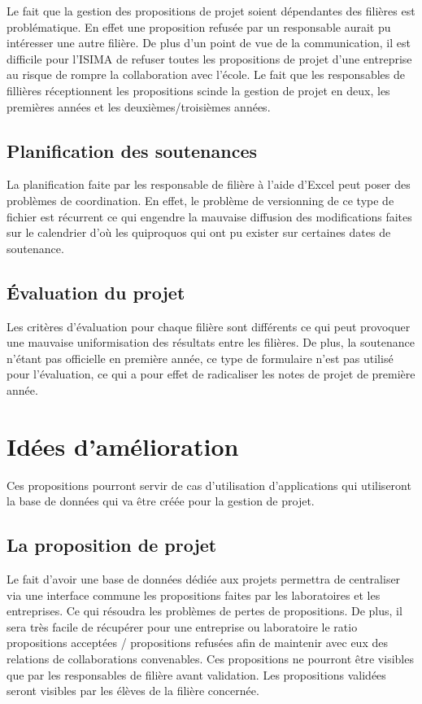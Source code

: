 \documentclass[a4paper,11pt]{report}
\begin{document}
\normalsize{
Le fait que la gestion des propositions de projet soient dépendantes des filières est problématique. En effet une proposition refusée par un responsable aurait pu intéresser une autre filière. De plus d'un point de vue de la communication, il est difficile pour l'ISIMA de refuser toutes les propositions de projet d'une entreprise au risque de rompre la collaboration avec l'école. Le fait que les responsables de fillières réceptionnent les propositions scinde la gestion de projet en deux, les premières années et les deuxièmes/troisièmes années.  
}

\subsection{Planification des soutenances}

\normalsize{
La planification faite par les responsable de filière à l'aide d'Excel peut poser des problèmes de coordination. En effet, le problème de versionning de ce type de fichier est récurrent ce qui engendre la mauvaise diffusion des modifications faites sur le calendrier d'où les quiproquos qui ont pu exister sur certaines dates de soutenance.
}

\subsection{Évaluation du projet}

\normalsize{
Les critères d'évaluation pour chaque filière sont différents ce qui peut provoquer une mauvaise uniformisation des résultats entre les filières. De plus, la soutenance n'étant pas officielle en première année, ce type de formulaire n'est pas utilisé pour l'évaluation, ce qui a pour effet de radicaliser les notes de projet de première année. 
}

\section{Idées d'amélioration}

\normalsize{
Ces propositions pourront servir de cas d'utilisation d'applications qui utiliseront la base de données qui va être créée pour la gestion de projet.
}

\subsection{La proposition de projet}

\normalsize{
Le fait d'avoir une base de données dédiée aux projets permettra de centraliser via une interface commune les propositions faites par les laboratoires et les entreprises. Ce qui résoudra les problèmes de pertes de propositions. De plus, il sera très facile de récupérer pour une entreprise ou laboratoire le ratio propositions acceptées / propositions refusées afin de maintenir avec eux des relations de collaborations convenables. Ces propositions ne pourront être visibles que par les responsables de filière avant validation. Les propositions validées seront visibles par les élèves de la filière concernée.     
}
\end{document}
